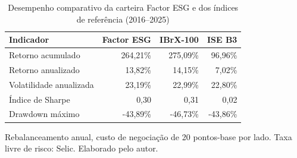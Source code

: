 \begin{table}[htbp]
\centering
\caption{Desempenho comparativo da carteira Factor ESG e dos índices de referência (2016--2025)}
\label{tab:desempenho}
\begin{tabular}{lrrr}
\toprule
Indicador & Factor ESG & IBrX-100 & ISE B3 \\
\midrule
Retorno acumulado & 264,21\% & 275,09\% & 96,96\% \\
Retorno anualizado & 13,82\% & 14,15\% & 7,02\% \\
Volatilidade anualizada & 23,19\% & 22,99\% & 22,80\% \\
Índice de Sharpe & 0,30 & 0,31 & 0,02 \\
Drawdown máximo & -43,89\% & -46,73\% & -43,86\% \\
\bottomrule
\end{tabular}
\begin{tablenotes}\small
\item Rebalanceamento anual, custo de negociação de 20 pontos-base por lado. Taxa livre de risco: Selic. Elaborado pelo autor.
\end{tablenotes}
\end{table}
